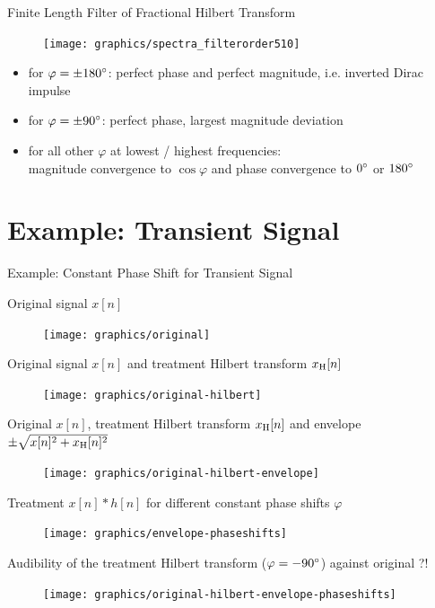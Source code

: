 \documentclass[mathserif]{beamer}
\begin{document}
%
%
%
\begin{frame}{Finite Length Filter of Fractional Hilbert Transform}
\begin{figure}
\texttt{[image: graphics/spectra\_filterorder510]}
\end{figure}

\begin{itemize}
\item for $\varphi=\pm 180\degree$: perfect phase and perfect magnitude, i.e. inverted Dirac impulse
\item for $\varphi=\pm 90\degree$: perfect phase, largest magnitude deviation
\item for all other $\varphi$ at lowest / highest frequencies:\\
magnitude convergence to $\cos\varphi$ and phase convergence to $0\degree$ or $180\degree$
\end{itemize}
\end{frame}
%
%
%
\section{Example: Transient Signal}
\begin{frame}{Example: Constant Phase Shift for Transient Signal}
{
Original signal $x[n]$
\begin{figure}
\texttt{[image: graphics/original]}
\end{figure}
}
{
Original signal $x[n]$ and treatment Hilbert transform $x_{\mathrm{H}}[n]$
\begin{figure}
\texttt{[image: graphics/original-hilbert]}
\end{figure}
}
{
Original $x[n]$, treatment Hilbert transform $x_{\mathrm{H}}[n]$ and envelope
$\pm\sqrt{x[n]^2+x_{\mathrm{H}}[n]^2}$
\begin{figure}
\texttt{[image: graphics/original-hilbert-envelope]}
\end{figure}
}
{
Treatment $x[n]\ast h[n]$ for different constant phase shifts $\varphi$
\begin{figure}
\texttt{[image: graphics/envelope-phaseshifts]}
\end{figure}
}
{
Audibility of the treatment Hilbert transform ($\varphi=-90\degree$) against original ?!
\begin{figure}
\texttt{[image: graphics/original-hilbert-envelope-phaseshifts]}
\end{figure}
}
\end{frame}
%
%
%
\end{document}
